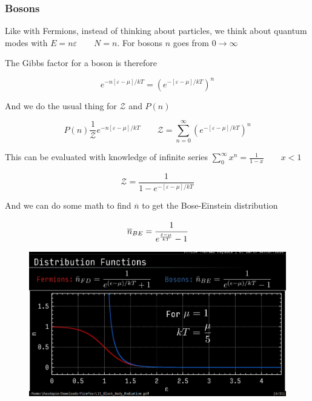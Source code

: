 \documentclass[10pt]{article}
\begin{document}
\subsubsection{Bosons}

Like with Fermions, instead of thinking about particles, we think about quantum modes with $ E = n\varepsilon \qquad N = n $. 
For bosons $ n $ goes from $ 0 \rightarrow \infty $ 

The Gibbs factor for a boson is therefore

\begin{equation}
	e^{-n[\varepsilon - \mu] /kT} 
	= 
	(e^{-[\varepsilon - \mu] /kT} )^n
\end{equation}

And we do the usual thing for $ \mathcal{Z} $ and $ P(n) $ 

\begin{equation}
	P(n) \frac{1}{\mathcal{Z}} 
	e^{-n[\varepsilon - \mu] /kT} 
	\qquad
	\mathcal{Z} = \sum^\infty_{n = 0} 
	(e^{-[\varepsilon - \mu] /kT})^n
\end{equation}

This can be evaluated with knowledge of infinite series $ \sum^\infty_0 x^n = \frac{1}{1-x} \qquad x < 1 $

\begin{equation}
	\mathcal{Z} = \frac{1}{ 1- e^{-[\varepsilon - \mu] /kT} }
\end{equation}

And we can do some math to find $ \overline{n} $ to get the Bose-Einstein distribution

\begin{definition}
	\begin{equation}
		\overline{n}_{BE} = \cfrac{1}{e^{\frac{\varepsilon - \mu}{kT}} - 1}
		\label{eq:294:bose_einstein}
	\end{equation}

\end{definition}






\begin{figure}[H]
	\centering
	\includegraphics[width=0.8\linewidth]{img/image_2022-04-08-23-53-40.png}
\end{figure}
\end{document}

